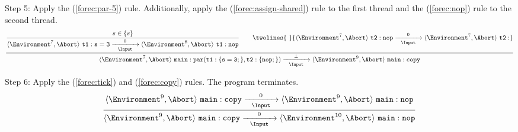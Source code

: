 \noindent
Step 5: Apply the (\ref{forec:par-5}) rule. Additionally, apply the (\ref{forec:assign-shared}) 
rule to the first thread and the (\ref{forec:nop}) rule to the second thread.
\begin{equation*}
	\frac{
		\dfrac{
				s \in \lbrace s \rbrace
			}{
				\langle \Environment^7, \Abort \rangle ~ \mathtt{t1: s=3}
					\xrightarrow[~~\Input~~]{0} 
				\langle \Environment^8, \Abort \rangle ~ \mathtt{t1: nop}
			}
			\qquad
		\twolines{
			~
			}{
				\langle \Environment^7, \Abort \rangle ~ \mathtt{t2: nop}
					\xrightarrow[~~\Input~~]{0} 
				\langle \Environment^7, \Abort \rangle ~ \mathtt{t2: }
			}
		}{
			\langle \Environment^7, \Abort \rangle ~ \mathtt{main: par(t1:\{s=3;\}, t2:\{nop;\})}
				\xrightarrow[~~\Input~~]{\bot} 
			\langle \Environment^9, \Abort \rangle ~ \mathtt{main: copy}
		}
\end{equation*}

\noindent
Step 6: Apply the (\ref{forec:tick}) and (\ref{forec:copy}) rules.
The program terminates.
\begin{equation*}
	\frac{
			\langle \Environment^9, \Abort \rangle ~ \mathtt{main: copy}
				\xrightarrow[~~\Input~~]{0} 
			\langle \Environment^9, \Abort \rangle ~ \mathtt{main: nop}
		}{
			\langle \Environment^9, \Abort \rangle ~ \mathtt{main: copy}
				\xrightarrow[~~\Input~~]{0} 
			\langle \Environment^{10}, \Abort \rangle ~ \mathtt{main: nop}
		}
\end{equation*}
